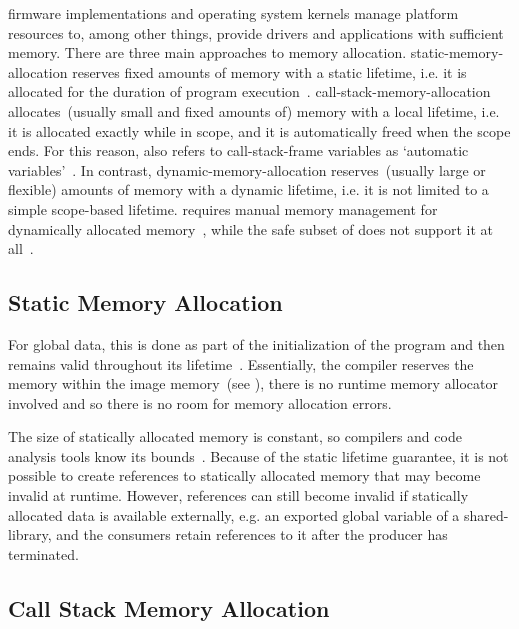 \Gls{firmware} implementations and operating system kernels manage platform resources to, among other things, provide drivers and applications with sufficient memory. There are three main approaches to memory allocation. \Gls{static-memory-allocation} reserves fixed amounts of memory with a static lifetime, i.e. it is allocated for the duration of program execution~\cite{ISO:2018:III,rust-ref}. \Gls{call-stack-memory-allocation} allocates~(usually small and fixed amounts of) memory with a local lifetime, i.e. it is allocated exactly while in scope, and it is automatically freed when the scope ends. For this reason,  also refers to \gls{call-stack-frame} variables as `automatic variables'~\cite{ISO:2018:III}. In contrast, \gls{dynamic-memory-allocation} reserves~(usually large or flexible) amounts of memory with a dynamic lifetime, i.e. it is not limited to a simple scope-based lifetime.  requires manual memory management for dynamically allocated memory~\cite{ISO:2018:III}, while the safe subset of  does not support it at all~\cite{rust-ref}.

\subsection{Static Memory Allocation}
\label{sec:static_mem_alloc}

For global data, this is done as part of the initialization of the program and then remains valid throughout its lifetime~\cite{ISO:2018:III,rust-ref}. Essentially, the compiler reserves the memory within the \gls{image} memory~(see ), there is no runtime memory allocator involved and so there is no room for memory allocation errors.

The size of statically allocated memory is constant, so compilers and code analysis tools know its bounds~\cite{ISO:2018:III,rust-ref}. Because of the static lifetime guarantee, it is not possible to create references to statically allocated memory that may become invalid at runtime. However, references can still become invalid if statically allocated data is available externally, e.g. an exported global variable of a \gls{shared-library}, and the consumers retain references to it after the producer has terminated.

\subsection{Call Stack Memory Allocation}
\label{sec:stack_mem_alloc}


